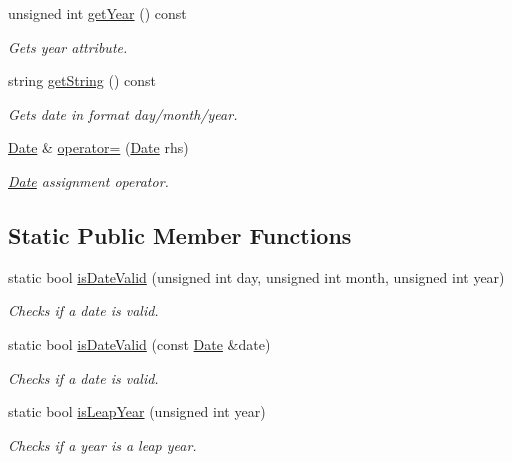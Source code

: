 \begin{DoxyCompactItemize}
unsigned int \hyperlink{class_date_a6561cf495bd6b7e6c747420d7ae9cc12}{get\+Year} () const 
\begin{DoxyCompactList}\small\item\em Gets year attribute. \end{DoxyCompactList}\item 
string \hyperlink{class_date_aae63c76af05fad3181883ba040bcd074}{get\+String} () const 
\begin{DoxyCompactList}\small\item\em Gets date in format day/month/year. \end{DoxyCompactList}\item 
\hyperlink{class_date}{Date} \& \hyperlink{class_date_a6835b4cfb6a3034a8daa0168c4e9d614}{operator=} (\hyperlink{class_date}{Date} rhs)
\begin{DoxyCompactList}\small\item\em \hyperlink{class_date}{Date} assignment operator. \end{DoxyCompactList}\end{DoxyCompactItemize}
\subsection*{Static Public Member Functions}
\begin{DoxyCompactItemize}
\item 
static bool \hyperlink{class_date_ad99ae04c84eceaf1374d9f6617ad07cd}{is\+Date\+Valid} (unsigned int day, unsigned int month, unsigned int year)
\begin{DoxyCompactList}\small\item\em Checks if a date is valid. \end{DoxyCompactList}\item 
static bool \hyperlink{class_date_a9e2bc98c0ff058974a3276b4501b1cf5}{is\+Date\+Valid} (const \hyperlink{class_date}{Date} \&date)
\begin{DoxyCompactList}\small\item\em Checks if a date is valid. \end{DoxyCompactList}\item 
static bool \hyperlink{class_date_a11e14d85e1039e5a7fab1444a57cf15b}{is\+Leap\+Year} (unsigned int year)
\begin{DoxyCompactList}\small\item\em Checks if a year is a leap year. \end{DoxyCompactList}\end{DoxyCompactItemize}


